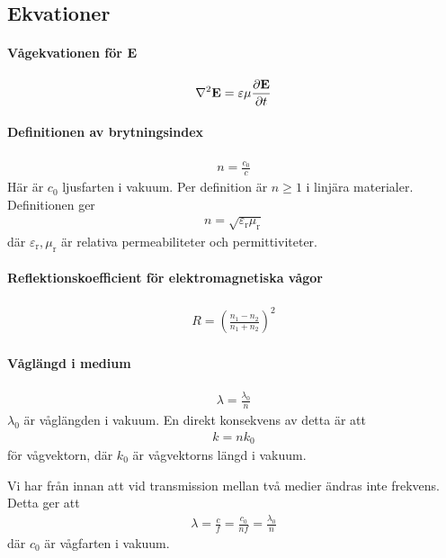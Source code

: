 \subsection{Ekvationer}

\paragraph{Vågekvationen för $\vect{E}$}
\begin{align*}
	\laplacian{\vect{E}} = \varepsilon\mu\pdv{\vect{E}}{t}
\end{align*}

\deriv

\paragraph{Definitionen av brytningsindex}
\begin{align*}
	n = \frac{c_0}{c}
\end{align*}
Här är $c_0$ ljusfarten i vakuum. Per definition är $n\geq 1$ i linjära materialer. Definitionen ger
\begin{align*}
	n = \sqrt{\varepsilon_{\text{r}}\mu_{\text{r}}}
\end{align*}
där $\varepsilon_{\text{r}}, \mu_{\text{r}}$ är relativa permeabiliteter och permittiviteter.

\paragraph{Reflektionskoefficient för elektromagnetiska vågor}
\begin{align*}
	R = \left(\frac{n_1 - n_2}{n_1 + n_2}\right)^2
\end{align*}

\paragraph{Våglängd i medium}
\begin{align*}
	\lambda = \frac{\lambda_0}{n}
\end{align*}
$\lambda_0$ är våglängden i vakuum. En direkt konsekvens av detta är att
\begin{align*}
	k = nk_0
\end{align*}
för vågvektorn, där $k_0$ är vågvektorns längd i vakuum.

\deriv
Vi har från innan att vid transmission mellan två medier ändras inte frekvens. Detta ger att
\begin{align*}
	\lambda = \frac{c}{f} = \frac{c_0}{nf} = \frac{\lambda_0}{n}
\end{align*}
där $c_0$ är vågfarten i vakuum.

